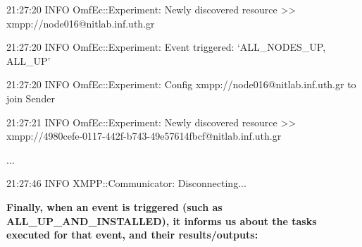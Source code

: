 \documentclass[letterpaper,10pt,english]{sphinxmanual}
\begin{document}
\begin{DUlineblock}{0em}
\item[] 21:27:20 INFO  OmfEc::Experiment: Newly discovered resource \textgreater{}\textgreater{} xmpp://node016@nitlab.inf.uth.gr
\item[] 21:27:20 INFO  OmfEc::Experiment: Event triggered: `ALL\_NODES\_UP, ALL\_UP'
\item[] 21:27:20 INFO  OmfEc::Experiment: Config xmpp://node016@nitlab.inf.uth.gr to join Sender
\item[] 21:27:21 INFO  OmfEc::Experiment: Newly discovered resource \textgreater{}\textgreater{} xmpp://4980cefe-0117-442f-b743-49e57614fbcf@nitlab.inf.uth.gr
\item[] ...
\item[] 21:27:46 INFO  XMPP::Communicator: Disconnecting...
\end{DUlineblock}

\begin{DUlineblock}{0em}
\item[] \textbf{Finally, when an event is triggered (such as ALL\_UP\_AND\_INSTALLED), it informs us about the tasks executed for that event, and their results/outputs:}
\end{DUlineblock}
\end{document}

